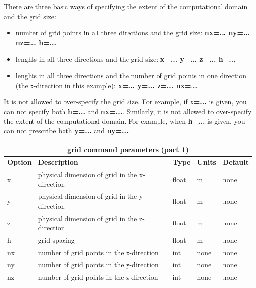 \documentclass[11pt]{report}
\begin{document}
There are three basic ways of specifying the extent of the computational domain and the grid size:  
\begin{itemize}
   \item number of grid points in all three directions and the grid size: {\bf nx=... ny=... nz=... h=...}
   \item lenghts in all three directions and the grid size: {\bf x=... y=... z=... h=...}
   \item lenghts in all three directions and the number of grid points in one direction (the
   x-direction in this example): {\bf x=... y=... z=... nx=...}
\end{itemize}
It is not allowed to over-specify the grid size. For example, if {\bf x=...} is given, you can not
specify both {\bf h=...} and {\bf nx=...}. Similarly, it is not allowed to over-specify the extent
of the computational domain. For example, when {\bf h=...} is given, you can not prescribe both {\bf
  y=...} and {\bf ny=...}.
%
\begin{center}
\begin{tabular}{|l|p{8cm}|l|l|l|} \hline
\multicolumn{5}{|c|}{\bf grid command parameters (part 1)}\\ \hline
\bf{Option} & \bf{Description} & \bf{Type} & \bf{Units} & \bf{Default}\\ \hline \hline
x & physical dimension of grid in the x-direction & float & m & none\\ \hline
y & physical dimension of grid in the y-direction & float & m & none\\ \hline
z & physical dimension of grid in the z-direction & float & m & none\\ \hline
\hline
h & grid spacing & float & m & none\\ \hline
\hline
nx & number of grid points in the x-direction & int & none & none\\ \hline
ny & number of grid points in the y-direction & int & none & none\\ \hline	
nz & number of grid points in the z-direction & int & none & none\\ \hline	
\end{tabular}
\end{center}
\end{document}
